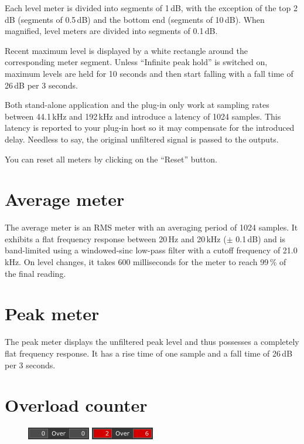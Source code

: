 Each level meter is divided into segments of 1\,dB, with the exception
of the top 2\,dB (segments of 0.5\,dB) and the bottom end (segments of
10\,dB).  When magnified, level meters are divided into segments of
0.1\,dB.

Recent maximum level is displayed by a white rectangle around the
corresponding meter segment.  Unless ``Infinite peak hold'' is
switched on, maximum levels are held for 10 seconds and then start
falling with a fall time of 26\,dB per 3 seconds.

Both stand-alone application and the plug-in only work at sampling
rates between 44.1\,kHz and 192\,kHz and introduce a latency of 1024
samples.  This latency is reported to your plug-in host so it may
compensate for the introduced delay.  Needless to say, the original
unfiltered signal is passed to the outputs.

You can reset all meters by clicking on the ``Reset'' button.

\section{Average meter}

The average meter is an RMS meter with an averaging period of 1024
samples.  It exhibits a flat frequency response between 20\,Hz and
20\,kHz ($\pm$ 0.1\,dB) and is band-limited using a windowed-sinc
low-pass filter with a cutoff frequency of 21.0\,kHz.  On level
changes, it takes 600 milliseconds for the meter to reach 99\,\% of
the final reading.

\section{Peak meter}

The peak meter displays the unfiltered peak level and thus possesses a
completely flat frequency response.  It has a rise time of one sample
and a fall time of 26\,dB per 3 seconds.

\section{Overload counter}

\begin{figure}
  \includegraphics[scale=\screenshotscale,clip]{include/images/overload_counter_normal.png}
  \newline \vspace{-0.9\baselineskip}
  \includegraphics[scale=\screenshotscale,clip]{include/images/overload_counter_clipped.png}
\end{figure}

